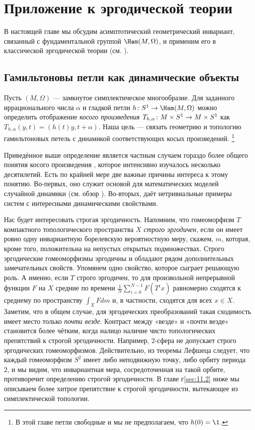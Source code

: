 \chapter[Эргодическая теория]{Приложение к эргодической теории}\label{chap:11}

В настоящей главе мы обсудим асимптотический геометрический инвариант,
связанный с фундаментальной группой $\Ham(M, \Omega)$, и применим его
в классической эргодической теории (см. \cite{P9}). 

\section{Гамильтоновы петли как динамические объекты}\label{sec:11.1}

Пусть $(M,\Omega)$ --- замкнутое симплектическое многообразие.
Для заданного иррационального числа $\alpha$ и гладкой петли $h\:S^1\z\to\Ham(M,\Omega)$ можно определить отображение \emph{косого произведения} $T_{h,\alpha} \: M \times S^1 \z\to M\times S^1$ как $T_{h,\alpha}(y,t)=(h(t)y,t+\alpha)$.
Наша цель --- связать геометрию и топологию гамильтоновых петель с динамикой соответствующих косых произведений.%
\footnote{В этой главе петли свободные и мы не предполагаем, что $h(0) = \1$.}

Приведённое выше определение является частным случаем гораздо более
общего понятия косого произведения  \cite[с. 231]{CFS}, которое
интенсивно изучалось несколько десятилетий. 
Есть по крайней мере две важные причины интереса к этому понятию.
Во-первых, оно служит основой для математических моделей случайной
динамики (см. обзор \cite{Ki}). 
Во-вторых, даёт нетривиальные примеры систем с интересными
динамическими свойствами. 

Нас будет интересовать строгая эргодичность.
Напомним, что гомеоморфизм $T$ компактного топологического пространства $X$ \emph{строго эргодичен}, если он имеет ровно одну инвариантную борелевскую вероятностную меру, скажем, $m$, которая, кроме того, положительна на непустых открытых подмножествах. 
Строго эргодические гомеоморфизмы эргодичны и обладают рядом
дополнительных замечательных свойств. 
Упомянем одно свойство, которое сыграет решающую роль.
А именно, если $T$ строго эргодичен, то для произвольной непрерывной
функции $F$ на $X$ средние по времени
$\tfrac1N\sum_{i=0}^{N-1}F(T^ix)$ равномерно сходятся к среднему по
пространству $\int_XFdm$ и, в частности, сходятся для всех $x \in X$. 
Заметим, что в общем случае, для эргодических преобразований такая сходимость
имеет место только {}\emph{почти везде}. 
Контраст между «везде» и «почти везде» становится более чётким, когда
налицо наличие чисто топологических препятствий к строгой
эргодичности. 
Например, 2-сфера не допускает строго эргодических гомеоморфизмов.
Действительно, из теоремы Лефшеца следует, что каждый гомеоморфизм
$S^2$ имеет либо неподвижную точку, либо орбиту периода $2$, и мы
видим, что инвариантная мера, сосредоточенная на такой орбите,
противоречит определению строгой эргодичности. 
В главе г\ref{sec:11.2} ниже мы описываем более хитрое препятствие к строгой
эргодичности, вытекающее из симплектической топологии. 

